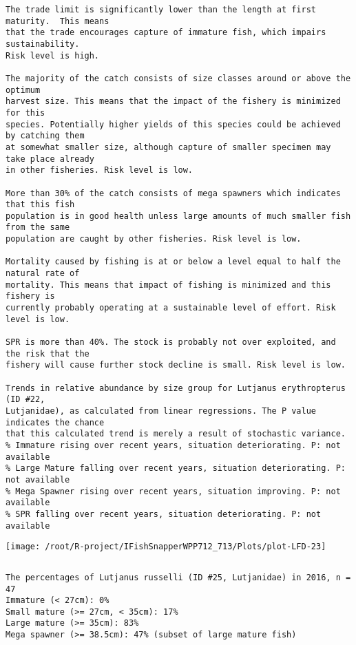 \documentclass{report}\usepackage[]{graphicx}\usepackage[]{color}
\makeatletter
\def\maxwidth{ %
  \ifdim\Gin@nat@width>\linewidth
    \linewidth
  \else
    \Gin@nat@width
  \fi
}
\newenvironment{kframe}{%
 \def\at@end@of@kframe{}%
 \ifinner\ifhmode%
  \def\at@end@of@kframe{\end{minipage}}%
  \begin{minipage}{\columnwidth}%
 \fi\fi%
 \def\FrameCommand##1{\hskip\@totalleftmargin \hskip-\fboxsep
 \colorbox{shadecolor}{##1}\hskip-\fboxsep
     \hskip-\linewidth \hskip-\@totalleftmargin \hskip\columnwidth}%
 \MakeFramed {\advance\hsize-\width
   \@totalleftmargin\z@ \linewidth\hsize
   \@setminipage}}%
 {\par\unskip\endMakeFramed%
 \at@end@of@kframe}
\newenvironment{knitrout}{}{} %
\makeatother
\begin{document}
\begin{knitrout}
\begin{kframe}
\begin{verbatim}
The trade limit is significantly lower than the length at first maturity.  This means
that the trade encourages capture of immature fish, which impairs sustainability.
Risk level is high.

The majority of the catch consists of size classes around or above the optimum
harvest size. This means that the impact of the fishery is minimized for this
species. Potentially higher yields of this species could be achieved by catching them
at somewhat smaller size, although capture of smaller specimen may take place already
in other fisheries. Risk level is low.

More than 30% of the catch consists of mega spawners which indicates that this fish
population is in good health unless large amounts of much smaller fish from the same
population are caught by other fisheries. Risk level is low.
 
Mortality caused by fishing is at or below a level equal to half the natural rate of
mortality. This means that impact of fishing is minimized and this fishery is
currently probably operating at a sustainable level of effort. Risk level is low.
 
SPR is more than 40%. The stock is probably not over exploited, and the risk that the
fishery will cause further stock decline is small. Risk level is low.
 
Trends in relative abundance by size group for Lutjanus erythropterus (ID #22,
Lutjanidae), as calculated from linear regressions. The P value indicates the chance
that this calculated trend is merely a result of stochastic variance.
% Immature rising over recent years, situation deteriorating. P: not available
% Large Mature falling over recent years, situation deteriorating. P: not available
% Mega Spawner rising over recent years, situation improving. P: not available
% SPR falling over recent years, situation deteriorating. P: not available
\end{verbatim}
\end{kframe}
\texttt{[image: /root/R-project/IFishSnapperWPP712\_713/Plots/plot-LFD-23]} 
\begin{kframe}\begin{verbatim}
\end{verbatim}
\end{kframe}
\clearpage
\newpage
\begin{kframe}\begin{verbatim}
The percentages of Lutjanus russelli (ID #25, Lutjanidae) in 2016, n = 47
Immature (< 27cm): 0%
Small mature (>= 27cm, < 35cm): 17%
Large mature (>= 35cm): 83%
Mega spawner (>= 38.5cm): 47% (subset of large mature fish)
 

\end{verbatim}
\end{kframe}
\end{knitrout}
\end{document}
